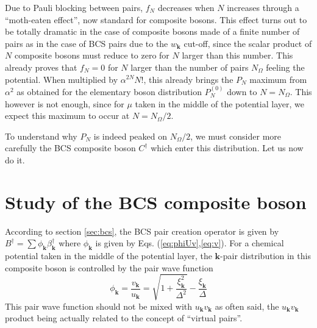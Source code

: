 \documentclass[aps,prb,preprint,groupedaddress,amsmath]{revtex4-1}
\newcommand{\vk}{\ensuremath{\mathbf{k}}}
\newcommand{\dg}{\ensuremath{\dagger}}
\begin{document}
Due to  Pauli blocking between pairs,  $f_N$ decreases when $N$ increases through a ``moth-eaten effect'', now standard for composite bosons. This effect turns out to be totally dramatic in the case of composite bosons made of a finite number of pairs as in the case of BCS pairs due to the $w_\vk$ cut-off, since the scalar product of $N$ composite bosons must reduce to zero for $N$ larger than this number.  This already proves that $f_N=0$ for $N$ larger than the number of pairs $N_\Omega$ feeling the potential.  When multiplied by $\alpha^{2N}N!$, this already brings the $P_N$ maximum from $\alpha^2$ as obtained for the elementary boson distribution $P_N^{(0)}$ down to $N=N_\Omega$. This however is not enough, since   for $\mu$ taken in the middle of the potential layer, we expect this maximum to occur at $N=N_\Omega/2$.

To understand why $P_N$ is indeed peaked on $N_\Omega/2$, we must consider more carefully the BCS composite boson $C^\dg$ which enter this distribution.  Let us now do it.  
\section{Study of the BCS composite boson}
According to section \ref{sec:bcs}, the BCS pair creation operator is given by  $B^\dg=\sum{}\phi_\vk\beta^\dg_\vk$ where $\phi_\vk$ is given by Eqs. (\ref{eq:phiUv},\ref{eq:v}).  For a chemical potential taken in the middle of the potential layer, the $\vk$-pair distribution in this composite boson is  controlled by the pair wave function
\begin{equation}
\phi_\vk=\frac{v_\vk}{u_\vk}=\sqrt{1+\frac{\xi_\vk^2}{\Delta^2}}-\frac{\xi_\vk}{\Delta}
\end{equation}
This pair wave function should not be mixed with $u_\vk{}v_\vk$ as often said, the $u_\vk{}v_\vk$ product being actually related to the concept of ``virtual pairs''.   
\end{document}
